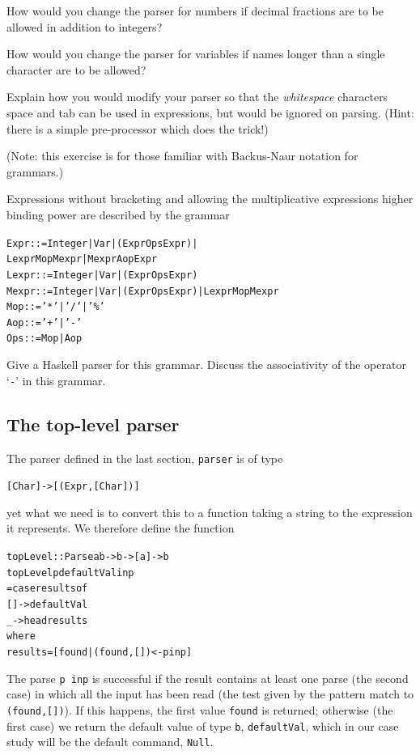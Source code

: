\begin{exercises}
\item
How would you change the parser for numbers if decimal fractions are to be
allowed in addition to integers?

\item
How would you change the parser for variables if names longer than a single
character are to be allowed? 

\item
Explain how you would modify your parser so that the {\em whitespace\/}
characters space and tab can be used in expressions, but would be ignored on
parsing. (Hint: there is a simple pre-processor which does the trick!)

\item 
(Note: this exercise is for those familiar with Backus-Naur
notation for grammars.) 

Expressions without bracketing and allowing the
multiplicative expressions higher binding power are described by the grammar
\begin{alltt}
Expr  ::= Integer | Var | (Expr Ops Expr) |
          Lexpr Mop Mexpr | Mexpr Aop Expr
Lexpr ::= Integer | Var | (Expr Ops Expr)
Mexpr ::= Integer | Var | (Expr Ops Expr) | Lexpr Mop Mexpr
Mop   ::= '*' | '/' | '\%'
Aop   ::= '+' | '-'     
Ops   ::= Mop | Aop
\end{alltt}
Give a Haskell parser for this grammar. Discuss the associativity of the
operator `\texttt{-}' in this grammar.
\end{exercises}
\subsection*{The top-level parser}

The parser defined in the last section, \texttt{parser} is of type 
\begin{alltt}
[Char] -> [ (Expr,[Char]) ]
\end{alltt}
yet what we need is to convert this to a function taking a string to the
expression it represents. We therefore define the function
\begin{alltt}
topLevel :: Parse a b -> b -> [a] -> b
topLevel p defaultVal inp
  = case results of
      [] -> defaultVal
      _  -> head results
    where
    results = [ found | (found,[]) <- p inp ]
\end{alltt}
The parse \texttt{p inp} is successful if the result contains at least one parse
(the second case) in which all the input has
been read (the test given by the pattern match to \texttt{(found,[])}). If this
happens, the first value \texttt{found} is returned; otherwise (the first case) we return the default value of type \texttt{b}, \texttt{defaultVal}, which in our case study will be the default command, \texttt{Null}.


